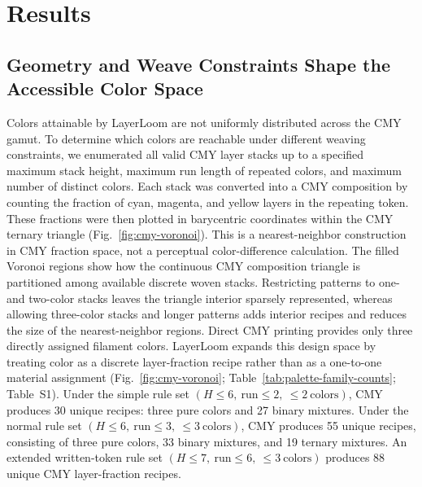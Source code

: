 \documentclass[5p,times,numbers]{elsarticle}
\begin{document}
\FloatBarrier





\section{Results}
\subsection{Geometry and Weave Constraints Shape the Accessible Color Space}

Colors attainable by LayerLoom are not uniformly distributed across the CMY gamut.
To determine which colors are reachable under different weaving constraints, we enumerated all valid CMY layer stacks up to a specified maximum stack height, maximum run length of repeated colors, and maximum number of distinct colors.
Each stack was converted into a CMY composition by counting the fraction of cyan, magenta, and yellow layers in the repeating token.
These fractions were then plotted in barycentric coordinates within the CMY ternary triangle (Fig.~\ref{fig:cmy-voronoi}).
This is a nearest-neighbor construction in CMY fraction space, not a perceptual color-difference calculation.
The filled Voronoi regions show how the continuous CMY composition triangle is partitioned among available discrete woven stacks.
Restricting patterns to one- and two-color stacks leaves the triangle interior sparsely represented, whereas allowing three-color stacks and longer patterns adds interior recipes and reduces the size of the nearest-neighbor regions.
Direct CMY printing provides only three directly assigned filament colors.
LayerLoom expands this design space by treating color as a discrete layer-fraction recipe rather than as a one-to-one material assignment (Fig.~\ref{fig:cmy-voronoi}; Table~\ref{tab:palette-family-counts}; Table~S1).
Under the simple rule set \((H \leq 6,\ \mathrm{run} \leq 2,\ \leq 2\ \mathrm{colors})\), CMY produces 30 unique recipes: three pure colors and 27 binary mixtures.
Under the normal rule set \((H \leq 6,\ \mathrm{run} \leq 3,\ \leq 3\ \mathrm{colors})\), CMY produces 55 unique recipes, consisting of three pure colors, 33 binary mixtures, and 19 ternary mixtures.
An extended written-token rule set \((H \leq 7,\ \mathrm{run} \leq 6,\ \leq 3\ \mathrm{colors})\) produces 88 unique CMY layer-fraction recipes.
\end{document}
